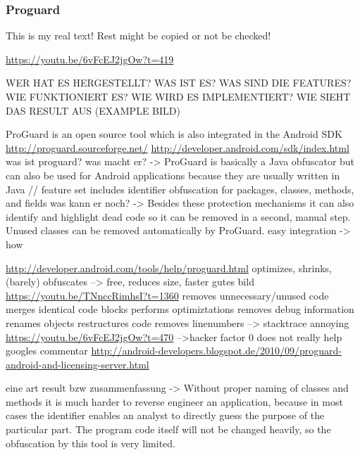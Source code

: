 \subsubsection{Proguard} \label{subsubsection:counter-reengineering-optobf-proguard}
This is my real text! Rest might be copied or not be checked!



\url{https://youtu.be/6vFcEJ2jgOw?t=419}\newline

WER HAT ES HERGESTELLT? WAS IST ES? WAS SIND DIE FEATURES? WIE FUNKTIONIERT ES? WIE WIRD ES IMPLEMENTIERT? WIE SIEHT DAS RESULT AUS (EXAMPLE BILD)\newline

ProGuard is an open source tool which is also integrated in the Android SDK
\url{http://proguard.sourceforge.net/}
\url{http://developer.android.com/sdk/index.html}\newline
was ist proguard? was macht er? -> ProGuard is basically a Java obfuscator but can also be used for Android applications because they are usually written in Java // feature set includes identifier obfuscation for packages, classes, methods, and fields\newline
was kann er noch? -> Besides these protection mechanisms it can also identify and highlight dead code so it can be removed in a second, manual step. Unused classes can be removed automatically by ProGuard.\newline
easy integration -> how\newline

\url{http://developer.android.com/tools/help/proguard.html}\newline
optimizes, shrinks, (barely) obfuscates --> free, reduces size, faster\newline
gutes bild \url{https://youtu.be/TNnccRimhsI?t=1360}\newline
removes unnecessary/unused code\newline
merges identical code blocks\newline
performs optimiztations\newline
removes debug information\newline
renames objects\newline
restructures code\newline
removes linenumbers --> stacktrace annoying\newline
\url{https://youtu.be/6vFcEJ2jgOw?t=470}\newline
-->hacker factor 0\newline
does not really help\newline
googles commentar \url{http://android-developers.blogspot.de/2010/09/proguard-android-and-licensing-server.html}\newline

eine art result bzw zusammenfassung -> Without proper naming of classes and methods it is much harder to reverse engineer an application, because in most cases the identifier enables an analyst to directly guess the purpose of the particular part. The program code itself will not be changed heavily, so the obfuscation by this tool is very limited.
